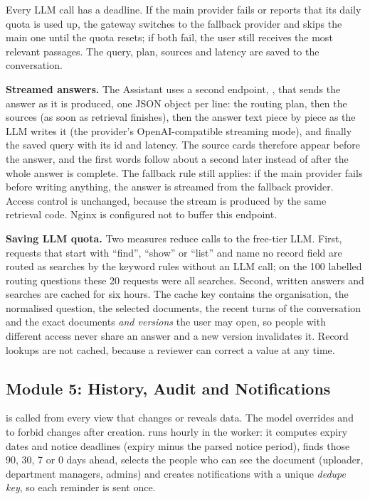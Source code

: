 Every LLM call has a deadline. If the main provider fails or reports that its daily quota is used up,
the gateway switches to the fallback provider and skips the main one until the quota resets; if both
fail, the user still receives the most relevant passages. The query, plan, sources and latency are
saved to the conversation.

\textbf{Streamed answers.} The Assistant uses a second endpoint, ,
that sends the answer as it is produced, one JSON object per line: the routing plan, then the sources
(as soon as retrieval finishes), then the answer text piece by piece as the LLM writes it (the provider's
OpenAI-compatible streaming mode), and finally the saved query with its id and latency. The source cards
therefore appear before the answer, and the first words follow about a second later instead of after
the whole answer is complete. The fallback rule still applies: if the main provider fails before writing
anything, the answer is streamed from the fallback provider. Access control is unchanged, because the
stream is produced by the same retrieval code. Nginx is configured not to buffer this endpoint.

\textbf{Saving LLM quota.} Two measures reduce calls to the free-tier LLM. First, requests that start with
``find'', ``show'' or ``list'' and name no record field are routed as searches by the keyword rules without an LLM
call; on the 100 labelled routing questions these 20 requests were all searches. Second, written answers and
searches are cached for six hours. The cache key contains the organisation, the normalised question, the
selected documents, the recent turns of the conversation and the exact documents \emph{and versions} the user
may open, so people with different access never share an answer and a new version invalidates it. Record
lookups are not cached, because a reviewer can correct a value at any time.

\subsection{Module 5: History, Audit and Notifications}
 is called from every view that changes or reveals data. The
 model overrides  and  to forbid changes after creation.
 runs hourly in the worker: it computes expiry dates and
notice deadlines (expiry minus the parsed notice period), finds those 90, 30, 7 or 0 days ahead, selects
the people who can see the document (uploader, department managers, admins) and creates notifications
with a unique \emph{dedupe key}, so each reminder is sent once.

